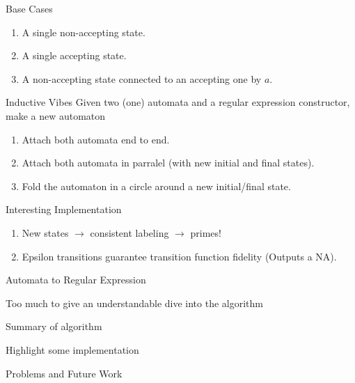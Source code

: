 \documentclass{beamer}
\begin{document}
\begin{frame}{Base Cases}
	\large
	\begin{enumerate}[]\item {} A single non-accepting state.
		\item {} A single accepting state. 
		\item {} A non-accepting state connected to an accepting one by $a$.
	\end{enumerate}
\end{frame}

\begin{frame}{Inductive Vibes}
	\large
	Given two (one) automata and a regular expression constructor, make a new automaton
	\begin{enumerate}[]
		\item {} Attach both automata end to end.
		\item {} Attach both automata in parralel (with new initial and final states).
		\item {} Fold the automaton in a circle around a new initial/final state.
	\end{enumerate}
\end{frame}

\begin{frame}{Interesting Implementation}
	\large
	\begin{enumerate}[]
		\item New states $\rightarrow$ consistent labeling $\rightarrow$ primes!
		\item Epsilon transitions guarantee transition function fidelity (Outputs a NA). 
		
	\end{enumerate}
\end{frame}

\begin{frame}{Automata to Regular Expression}
	\centering \Large
	
	Too much to give an understandable dive into the algorithm\vspace{5mm}
	
	Summary of algorithm\vspace{5mm}
	
	Highlight some implementation\vspace{5mm}
	
	Problems and Future Work
\end{frame}
\end{document}
